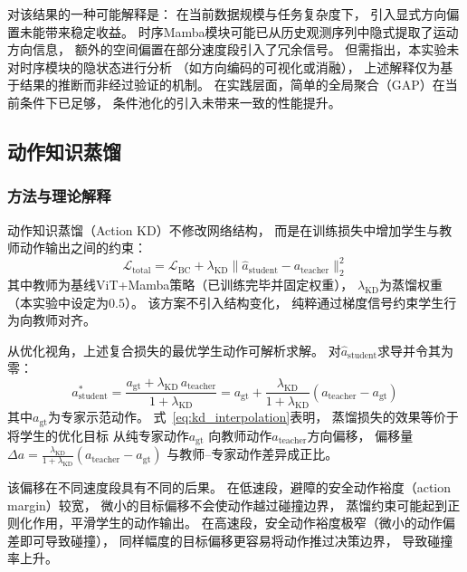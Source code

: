 对该结果的一种可能解释是：
在当前数据规模与任务复杂度下，
引入显式方向偏置未能带来稳定收益。
时序Mamba模块可能已从历史观测序列中隐式提取了运动方向信息，
额外的空间偏置在部分速度段引入了冗余信号。
但需指出，本实验未对时序模块的隐状态进行分析
（如方向编码的可视化或消融），
上述解释仅为基于结果的推断而非经过验证的机制。
在实践层面，简单的全局聚合（GAP）在当前条件下已足够，
条件池化的引入未带来一致的性能提升。

\subsection{动作知识蒸馏}

\subsubsection{方法与理论解释}

动作知识蒸馏（Action KD）不修改网络结构，
而是在训练损失中增加学生与教师动作输出之间的约束：
\begin{equation}
  \mathcal{L}_{\text{total}} = \mathcal{L}_{\text{BC}} + \lambda_{\text{KD}} \| \hat{a}_{\text{student}} - a_{\text{teacher}} \|_2^2
\end{equation}
其中教师为基线ViT+Mamba策略（已训练完毕并固定权重），
$\lambda_{\text{KD}}$为蒸馏权重（本实验中设定为$0.5$）。
该方案不引入结构变化，
纯粹通过梯度信号约束学生行为向教师对齐。

从优化视角，上述复合损失的最优学生动作可解析求解。
对$\hat{a}_{\text{student}}$求导并令其为零：
\begin{equation}
  a^*_{\text{student}} = \frac{a_{\text{gt}} + \lambda_{\text{KD}} \, a_{\text{teacher}}}{1 + \lambda_{\text{KD}}}
  = a_{\text{gt}} + \frac{\lambda_{\text{KD}}}{1 + \lambda_{\text{KD}}} \left( a_{\text{teacher}} - a_{\text{gt}} \right)
\label{eq:kd_interpolation}
\end{equation}
其中$a_{\text{gt}}$为专家示范动作。
式~\eqref{eq:kd_interpolation}表明，
蒸馏损失的效果等价于将学生的优化目标
从纯专家动作$a_{\text{gt}}$
向教师动作$a_{\text{teacher}}$方向偏移，
偏移量$\Delta a = \frac{\lambda_{\text{KD}}}{1+\lambda_{\text{KD}}} (a_{\text{teacher}} - a_{\text{gt}})$
与教师--专家动作差异成正比。

该偏移在不同速度段具有不同的后果。
在低速段，避障的安全动作裕度（action margin）较宽，
微小的目标偏移不会使动作越过碰撞边界，
蒸馏约束可能起到正则化作用，平滑学生的动作输出。
在高速段，安全动作裕度极窄（微小的动作偏差即可导致碰撞），
同样幅度的目标偏移更容易将动作推过决策边界，
导致碰撞率上升。

